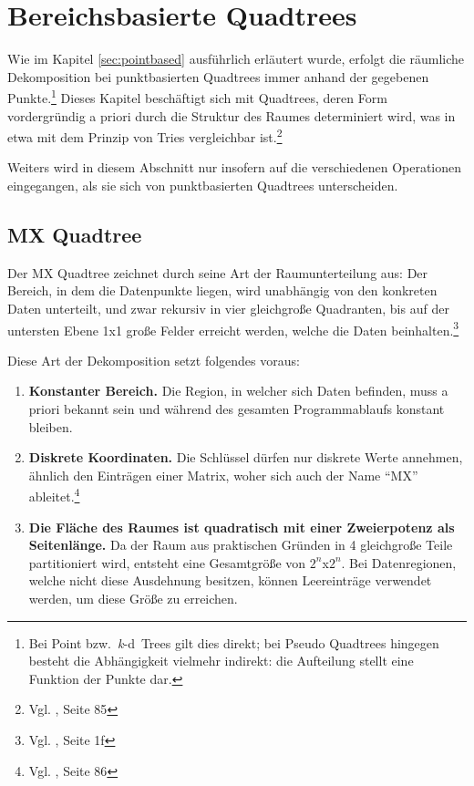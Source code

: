\documentclass[%
			paper=a4,%
			DIV12,
			liststotoc,
			bibtotoc,
			draft=false,%
			titlepage
			]{scrartcl}
\newcommand{\zit}[3]{#1 \cite{#2}, #3}
\newcommand{\footzit}[3]{\footnote{\zit{#1}{#2}{#3}}}
\newcommand{\kd}{\mbox{\textit{k}-d}}
\begin{document}

\section{Bereichsbasierte Quadtrees}

Wie im Kapitel \ref{sec:pointbased} ausführlich erläutert wurde, erfolgt die räumliche Dekomposition bei punktbasierten Quadtrees immer anhand der gegebenen Punkte.\footnote{Bei Point bzw.\ \kd\ Trees gilt dies direkt; bei Pseudo Quadtrees hingegen besteht die Abhängigkeit vielmehr indirekt: die Aufteilung stellt eine Funktion der Punkte dar.}
Dieses Kapitel beschäftigt sich mit Quadtrees, deren Form vordergründig a priori durch die Struktur des Raumes determiniert wird, was in etwa mit dem Prinzip von Tries vergleichbar ist.\footzit{Vgl.}{Samet90}{Seite 85}

Weiters wird in diesem Abschnitt nur insofern auf die verschiedenen Operationen eingegangen, als sie sich von punktbasierten Quadtrees unterscheiden.

\subsection{MX Quadtree}
Der MX Quadtree zeichnet durch seine Art der Raumunterteilung aus:
Der Bereich, in dem die Datenpunkte liegen, wird unabhängig von den konkreten Daten unterteilt,
und zwar rekursiv in vier gleichgroße Quadranten, 
bis auf der untersten Ebene 1x1 große Felder erreicht werden, welche die Daten beinhalten.\footzit{Vgl.}{Samet:1985:SCP:282957.282966}{Seite 1f}

Diese Art der Dekomposition setzt folgendes voraus:
\renewcommand{\labelenumi}{({\theenumi})}
\begin{enumerate}
	\item \textbf{Konstanter Bereich.}
		Die Region, in welcher sich Daten befinden, muss a priori bekannt sein und während des gesamten Programmablaufs konstant bleiben.
	\item \textbf{Diskrete Koordinaten.}
		Die Schlüssel dürfen nur diskrete Werte annehmen, ähnlich den Einträgen einer Matrix, woher sich auch der Name "`MX"' ableitet.\footzit{Vgl.}{Samet90}{Seite 86}
	\item \textbf{Die Fläche des Raumes ist quadratisch mit einer Zweierpotenz als Seitenlänge.}
		Da der Raum aus praktischen Gründen in 4 gleichgroße Teile partitioniert wird, entsteht eine Gesamtgröße von $2^n$x$2^n$. Bei Datenregionen, welche nicht diese Ausdehnung besitzen, können Leereinträge verwendet werden, um diese Größe zu erreichen.
\end{enumerate}
\end{document}
